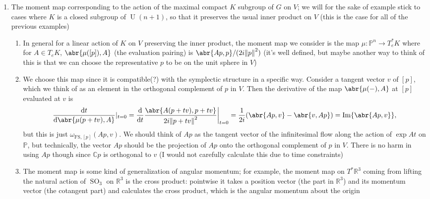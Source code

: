 \documentclass[11pt,leqno]{article}
\theoremstyle{plain}
\theoremstyle{definition}
\numberwithin{equation}{section}
\numberwithin{lem}{section}
\DeclareMathOperator{\SO}{SO}
\DeclareMathOperator{\U}{U}
\begin{document}
\begin{enumerate}
\begin{enumerate}
\begin{enumerate}
            \item Then the Fubini-Study form is given by the following formula: For $v,w\in T_{[p]}\mathbb P^n$, $\omega_{\mathrm{FS},[p]}(v,w) = \Im \abr{v,w}$ (we will take this as a definition)
            \item This description of the Fubini-Study form will be used to define something called a moment map which will satisfy certain properties
        \end{enumerate}
        \item The moment map corresponding to the action of the maximal compact $K$ subgroup of $G$ on $V$; we will for the sake of example stick to cases where $K$ is a closed subgroup of $\U(n+1)$, so that it preserves the usual inner product on $V$ (this is the case for all of the previous examples)
        \begin{enumerate}
            \item In general for a linear action of $K$ on $V$ preserving the inner product, the moment map we consider is the map $\mu\colon \mathbb P^n\to T_e^\ast K$ where for $A\in T_eK$, $\abr{\mu([p]), A}$ (the evaluation pairing) is $\abr{Ap,p}/(2i\norm{p}^2)$ (it's well defined, but maybe another way to think of this is that we can choose the representative $p$ to be on the unit sphere in $V$)
            \item We choose this map since it is compatible(?) with the symplectic structure in a specific way. Consider a tangent vector $v$ of $[p]$, which we think of as an element in the orthogonal complement of $p$ in $V$. Then the derivative of the map $\abr{\mu(-),A}$ at $[p]$ evaluated at $v$ is
            \[\dv{t}\abr{\mu(p+tv),A}|_{t=0} = \dv{t}\frac{\abr{A(p+tv),p+tv}}{2i\norm{p+tv}^2}\bigg|_{t=0} = \frac{1}{2i}(\abr{Ap,v}-\abr{v,Ap}) = \Im\abr{Ap,v},\]
            but this is just $\omega_{\mathrm{FS},[p]}(Ap,v)$. We should think of $Ap$ as the tangent vector of the infinitesimal flow along the action of $\exp At$ on $\mathbb P$, but technically, the vector $Ap$ should be the projection of $Ap$ onto the orthogonal complement of $p$ in $V$. There is no harm in using $Ap$ though since $\mathbb Cp$ is orthogonal to $v$
            (I would not carefully calculate this due to time constraints)
            \item The moment map is some kind of generalization of angular momentum; for example, the moment map on $T^\ast\mathbb R^3$ coming from lifting the natural action of $\SO_3$ on $\mathbb R^3$ is the cross product: pointwise it takes a position vector (the part in $\mathbb R^3$) and its momentum vector (the cotangent part) and calculates the cross product, which is the angular momentum about the origin

\end{enumerate}
\end{enumerate}
\end{enumerate}
\end{document}
